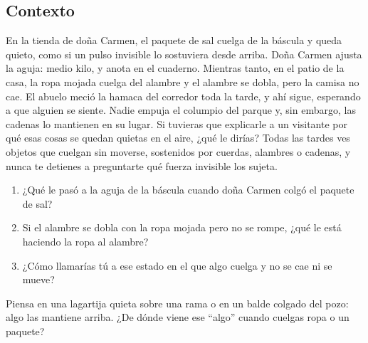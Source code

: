 \documentclass[
  spanish,
  letterpaper,
  12pt,
  oneside,
  open=any,
  DIV=15]{scrbook}
\providecommand{\tightlist}{%
  \setlength{\itemsep}{0pt}\setlength{\parskip}{0pt}}
\begin{document}
\subsection{Contexto}\label{contexto-3}

En la tienda de doña Carmen, el paquete de sal cuelga de la báscula y
queda quieto, como si un pulso invisible lo sostuviera desde arriba.
Doña Carmen ajusta la aguja: medio kilo, y anota en el cuaderno.
Mientras tanto, en el patio de la casa, la ropa mojada cuelga del
alambre y el alambre se dobla, pero la camisa no cae. El abuelo meció la
hamaca del corredor toda la tarde, y ahí sigue, esperando a que alguien
se siente. Nadie empuja el columpio del parque y, sin embargo, las
cadenas lo mantienen en su lugar. Si tuvieras que explicarle a un
visitante por qué esas cosas se quedan quietas en el aire, ¿qué le
dirías? Todas las tardes ves objetos que cuelgan sin moverse, sostenidos
por cuerdas, alambres o cadenas, y nunca te detienes a preguntarte qué
fuerza invisible los sujeta.

\begin{tcolorbox}[enhanced jigsaw, arc=.35mm, bottomrule=.15mm, bottomtitle=1mm, breakable, colback=white, colbacktitle=quarto-callout-note-color!10!white, colframe=quarto-callout-note-color-frame, coltitle=black, left=2mm, leftrule=.75mm, opacityback=0, opacitybacktitle=0.6, rightrule=.15mm, title=\textcolor{quarto-callout-note-color}{\faInfo}\hspace{0.5em}{Reflexiona y Conecta (Preguntas de Comprensión)}, titlerule=0mm, toprule=.15mm, toptitle=1mm]

\begin{enumerate}
\def\labelenumi{\arabic{enumi}.}
\tightlist
\item
  ¿Qué le pasó a la aguja de la báscula cuando doña Carmen colgó el
  paquete de sal?
\item
  Si el alambre se dobla con la ropa mojada pero no se rompe, ¿qué le
  está haciendo la ropa al alambre?
\item
  ¿Cómo llamarías tú a ese estado en el que algo cuelga y no se cae ni
  se mueve?
\end{enumerate}

\end{tcolorbox}

\begin{tcolorbox}[enhanced jigsaw, arc=.35mm, bottomrule=.15mm, bottomtitle=1mm, breakable, colback=white, colbacktitle=quarto-callout-tip-color!10!white, colframe=quarto-callout-tip-color-frame, coltitle=black, left=2mm, leftrule=.75mm, opacityback=0, opacitybacktitle=0.6, rightrule=.15mm, title=\textcolor{quarto-callout-tip-color}{\faLightbulb}\hspace{0.5em}{Apoyo Procedimental (Pista)}, titlerule=0mm, toprule=.15mm, toptitle=1mm]

Piensa en una lagartija quieta sobre una rama o en un balde colgado del
pozo: algo las mantiene arriba. ¿De dónde viene ese ``algo'' cuando
cuelgas ropa o un paquete?

\end{tcolorbox}
\end{document}
